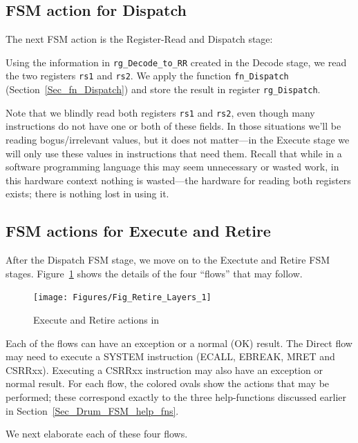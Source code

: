 \subsection{FSM action for Dispatch}

The next FSM action is the Register-Read and Dispatch stage:


Using the information in \verb|rg_Decode_to_RR| created in the Decode
stage, we read the two registers \verb|rs1| and \verb|rs2|.  We apply
the function \verb|fn_Dispatch| (Section~\ref{Sec_fn_Dispatch}) and
store the result in register \verb|rg_Dispatch|.

Note that we blindly read both registers \verb|rs1| and \verb|rs2|,
even though many instructions do not have one or both of these fields.
In those situations we'll be reading bogus/irrelevant values, but it
does not matter---in the Execute stage we will only use these values
in instructions that need them. Recall that while in a software
programming language this may seem unnecessary or wasted work, in this
hardware context nothing is wasted---the hardware for reading both
registers exists; there is nothing lost in using it.


\subsection{FSM actions for Execute and Retire}

After the Dispatch FSM stage, we move on to the Exectute and Retire
FSM stages.  Figure~\ref{Fig_Retire_Drum} shows the details of the
four ``flows'' that may follow.
\begin{figure}[htbp]
  \centerline{\texttt{[image: Figures/Fig\_Retire\_Layers\_1]}}
  \caption{\label{Fig_Retire_Drum}Execute and Retire actions in {\DRUM}}
\end{figure}
Each of the flows can have an exception or a normal (OK) result.  The
Direct flow may need to execute a SYSTEM instruction (ECALL, EBREAK,
MRET and CSRRxx).  Executing a CSRRxx instruction may also have an
exception or normal result.  For each flow, the colored ovals show the
actions that may be performed; these correspond exactly to the three
help-functions discussed earlier in
Section~\ref{Sec_Drum_FSM_help_fns}.

We next elaborate each of these four flows.

